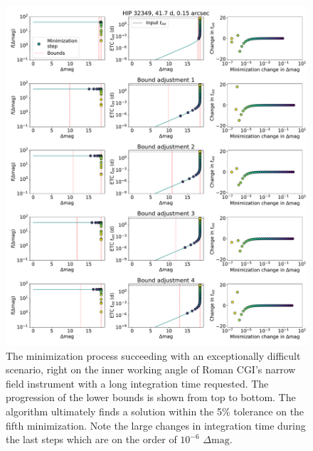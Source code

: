 \begin{figure}
  \begin{center}
    \includegraphics[height=0.75\textheight]{ch2/figures/minimzation_bound_comp.pdf}
  \end{center}
  \caption{The minimization process succeeding with an exceptionally difficult
    scenario, right on the inner working angle of Roman CGI's narrow field
    instrument with a long integration time requested. The progression of the
    lower bounds is shown from top to bottom. The algorithm ultimately finds a
  solution within the 5\% tolerance on the fifth minimization. Note the large
changes in integration time during the last steps which are on the order of
$10^{-6}$ $\Delta\textrm{mag}$.}
  \label{fig:minimzation_bound_comp}
\end{figure}

